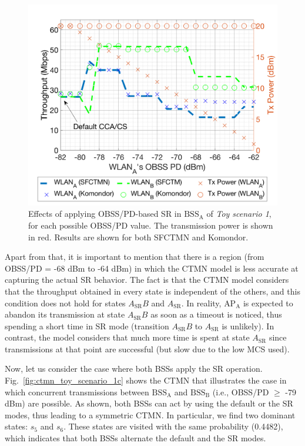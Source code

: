 \documentclass[preprint,12pt]{elsarticle}
\begin{document}
\begin{figure}[ht!]
	\centering
	\includegraphics[width=.6\columnwidth]{SIM_1_1}
	\caption{Effects of applying OBSS/PD-based SR in $\text{BSS}_\text{A}$ of \emph{Toy scenario 1}, for each possible OBSS/PD value. The transmission power is shown in red. Results are shown for both SFCTMN and Komondor.}		\label{fig:toy_scenario_1_results}
\end{figure}

Apart from that, it is important to mention that there is a region (from OBSS/PD = -68 dBm to -64 dBm) in which the CTMN model is less accurate at capturing the actual SR behavior. The fact is that the CTMN model considers that the throughput obtained in every state is independent of the others, and this condition does not hold for states $A_\text{SR}B$ and $A_\text{SR}$. In reality, $\text{AP}_\text{A}$ is expected to abandon its transmission at state $A_\text{SR}B$ as soon as a timeout is noticed, thus spending a short time in SR mode (transition $A_\text{SR}B$ to $A_\text{SR}$ is unlikely). In contrast, the model considers that much more time is spent at state $A_\text{SR}$ since transmissions at that point are successful (but slow due to the low MCS used).

Now, let us consider the case where both BSSs apply the SR operation. Fig.~\ref{fig:ctmn_toy_scenario_1c} shows the CTMN that illustrates the case in which concurrent transmissions between $\text{BSS}_\text{A}$ and $\text{BSS}_\text{B}$ (i.e., OBSS/PD $\geq$ -79 dBm) are possible. As shown, both BSSs can act by using the default or the SR modes, thus leading to a symmetric CTMN. In particular, we find two dominant states: $s_5$  and $s_6$. These states are visited with the same probability (0.4482), which indicates that both BSSs alternate the default and the SR modes. 
\end{document}
